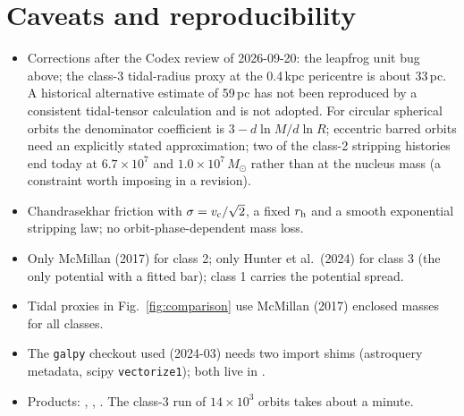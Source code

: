 \documentclass[11pt,a4paper]{article}
\newcommand{\Msun}{M_\odot}
\begin{document}
\section{Caveats and reproducibility}
\begin{itemize}
\item Corrections after the Codex review of 2026-09-20: the leapfrog unit bug above; the class-3
  tidal-radius proxy at the 0.4\,kpc pericentre is about 33\,pc. A historical alternative
  estimate of 59\,pc has not been reproduced by a consistent tidal-tensor calculation
  and is not adopted. For circular spherical orbits the denominator coefficient is
  $3-d\ln M/d\ln R$; eccentric barred orbits need an explicitly stated approximation; two of the class-2 stripping histories end today at
  $6.7\times10^7$ and $1.0\times10^7\,\Msun$ rather than at the nucleus mass (a constraint
  worth imposing in a revision).
\item Chandrasekhar friction with $\sigma=v_{\rm c}/\sqrt2$, a fixed $r_{\rm h}$ and a
  smooth exponential stripping law; no orbit-phase-dependent mass loss.
\item Only McMillan (2017) for class 2; only Hunter et al.\ (2024) for class 3 (the only
  potential with a fitted bar); class 1 carries the potential spread.
\item Tidal proxies in Fig.~\ref{fig:comparison} use McMillan (2017) enclosed masses for all
  classes.
\item The \texttt{galpy} checkout used (2024-03) needs two import shims (astroquery metadata,
  scipy \texttt{vectorize1}); both live in .
\item Products: , ,
  . The class-3 run of $14\times10^3$ orbits
  takes about a minute.
\end{itemize}
\end{document}
